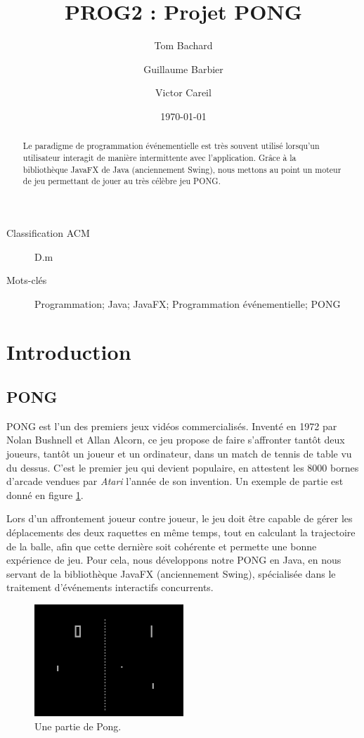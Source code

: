 \documentclass[a4paper,10pt]{article}
\theoremstyle{definition}
\begin{document}
%
\title{PROG2 : Projet PONG}
%
\author{Tom Bachard\and Guillaume Barbier\and Victor Careil}
%
\date{\today}
%
\maketitle
%
%

\begin{description}
  \item[Classification ACM] D.m
  \item[Mots-clés] Programmation; Java; JavaFX; Programmation événementielle; PONG
\end{description}

%
\begin{abstract}
Le paradigme de programmation événementielle est très souvent utilisé lorsqu'un utilisateur interagit de manière intermittente avec l'application. Grâce à la bibliothèque JavaFX de Java (anciennement Swing), nous mettons au point un moteur de jeu permettant de jouer au très célèbre jeu PONG.
\end{abstract}
%

%
\section{Introduction}
%

  \subsection{PONG}
	PONG est l'un des premiers jeux vidéos commercialisés. Inventé en 1972 par Nolan Bushnell et Allan Alcorn, ce jeu propose de faire s'affronter tantôt deux joueurs, tantôt un joueur et un ordinateur, dans un match de tennis de table vu du dessus. C'est le premier jeu qui devient populaire, en attestent les 8000 bornes d'arcade vendues par \emph{Atari} l'année de son invention. Un exemple de partie est donné en figure \ref{Pong1}.
	
	Lors d'un affrontement joueur contre joueur, le jeu doit être capable de gérer les déplacements des deux raquettes en même temps, tout en calculant la trajectoire de la balle, afin que cette dernière soit cohérente et permette une bonne expérience de jeu. Pour cela, nous développons notre PONG en Java, en nous servant de la bibliothèque JavaFX (anciennement Swing), spécialisée dans le traitement d'événements interactifs concurrents.
	
	\begin{figure}
  	  \begin{center}
    	    \includegraphics[width=0.5\textwidth]{Pong1}
    	    \caption{Une partie de Pong.}
    	    \label{Pong1}
  	  \end{center}
	\end{figure}	
	
\end{document}
